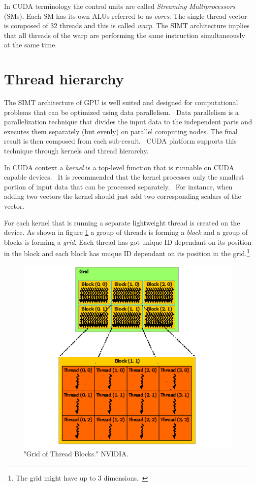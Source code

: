 \documentclass[12pt,oneside]{fithesis2}
\begin{document}
In CUDA terminology the control units are called \emph{Streaming Multiprocessors} (SMs). Each SM has its own ALUs referred to as \emph{cores}. The single thread vector is composed of 32 threads and this is called \emph{warp}. The SIMT architecture implies that all threads of the warp are performing the same instruction simultaneously at the same time.~\cite{cuda_guide}


\section{Thread hierarchy}
\label{thread_hierarchy}

The SIMT architecture of GPU is well suited and designed for computational problems that can be optimized using data parallelism.~\cite{professional_cuda} Data parallelism is a parallelization technique that divides the input data to the independent parts and executes them separately (but evenly) on parallel computing nodes. The final result is then composed from each sub-result.~\cite{data_parallel_algorithms} CUDA platform supports this technique through kernels and thread hierarchy.

In CUDA context a \emph{kernel} is a top-level function that is runnable on CUDA capable devices.~\cite{cuda_guide} It is recommended that the kernel processes only the smallest portion of input data that can be processed separately.~\cite{data_parallel_algorithms} For instance, when adding two vectors the kernel should just add two corresponding scalars of the vector.

For each kernel that is running a separate lightweight thread is created on the device. As shown in figure \ref{fig:grid} a group of threads is forming a \emph{block} and a group of blocks is forming a \emph{grid}. Each thread has got unique ID dependant on its position in the block and each block has unique ID dependant on its position in the grid.\footnote{The grid might have up to 3 dimensions.~\cite{cuda_guide}}

\begin{figure}[H]
	\centering
	\includegraphics[scale=0.9]{figures/grid-of-thread-blocks.png}
	\caption{"Grid of Thread Blocks." NVIDIA. \cite{cuda_guide}}
	\label{fig:grid}
\end{figure}
\end{document}
